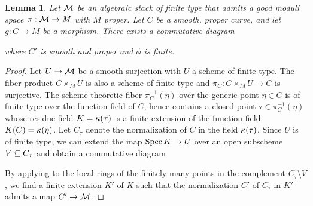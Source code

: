 \documentclass[letterpaper,12pt]{amsart}
\newtheorem{lem}[thm]{Lemma}
\theoremstyle{remark}
\begin{document}
\begin{lem}\label{finitecurveextension}
    Let $\mathcal{M}$ be an algebraic stack of finite type that admits a good moduli space $\pi: \mathcal{M} \to M$ with $M$ proper. Let $C$ be a smooth, proper curve, and let $g: C \to M$ be a morphism. There exists a commutative diagram
    \begin{center}
    \end{center}
    where $C'$ is smooth and proper and $\phi$ is finite.
\end{lem}
\begin{proof}
    Let $U \to \mathcal{M}$ be a smooth surjection with $U$ a scheme of finite type. The fiber product $C \times_M U$ is also a scheme of finite type and $\pi_C: C \times_M U \to C$ is surjective. The scheme-theoretic fiber $\pi_C^{-1}(\eta)$ over the generic point $\eta \in C$ is of finite type over the function field of $C$, hence contains a closed point $\tau \in \pi_C^{-1}(\eta)$ whose residue field $K = \kappa(\tau)$ is a finite extension of the function field $K(C) = \kappa(\eta)$. Let $C_\tau$ denote the normalization of $C$ in the field $\kappa(\tau)$. Since $U$ is of finite type, we can extend the map $\operatorname{\mathrm{Spec}} K \to U$ over an open subscheme $V \subseteq C_\tau$ and obtain a commutative diagram
    \begin{center}
    \end{center}
    By applying \cite[Theorem A.8]{AHLH} to the local rings of the finitely many points in the complement $C_\tau \setminus V$, we find a finite extension $K'$ of $K$ such that the normalization $C'$ of $C_\tau$ in $K'$ admits a map $C' \to \mathcal{M}$.
\end{proof}
\end{document}
